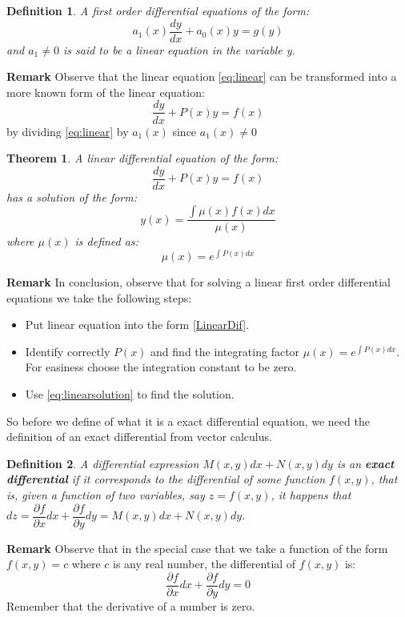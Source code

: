 \documentclass[10pt,a4paper]{article}
\newtheorem{define}{Definition}
\newtheorem{thm}{Theorem}
\begin{document}
\begin{define}
A first order differential equations of the form:
\begin{equation} \label{eq:linear}
a_1(x)\dfrac{dy}{dx} + a_0(x)y = g(y)
\end{equation}
and $a_1 \neq 0$ is said to be a linear equation in the variable y.
\end{define}
\textbf{Remark} Observe that the linear equation \eqref{eq:linear}
can be transformed into a more known form of the linear equation:
\begin{equation} \label{LinearDif}
\dfrac{dy}{dx} + P(x)y 	= f(x)
\end{equation}
by dividing \eqref{eq:linear} by $a_1(x)$ since $a_1(x) \neq 0$
\begin{thm}
A linear differential equation of the form:
\begin{equation*}
\dfrac{dy}{dx} + P(x)y 	= f(x)
\end{equation*}
has a solution of the form:
\begin{equation} \label{eq:linearsolution}
y(x) = \dfrac{\int \mu(x)f(x)dx}{ \mu(x)}
\end{equation}
where $\mu(x)$ is defined as:
\begin{equation*}
\mu(x) = e^{ \int P(x) dx}
\end{equation*}
\end{thm}
\textbf{Remark} In conclusion, observe that for solving a linear first order differential equations we take the following steps:
\begin{itemize}
\item Put linear equation into the form \eqref{LinearDif}.
\item Identify correctly $P(x)$ and find the integrating factor $ \mu(x) = e^{ \int P(x) dx}$. For easiness choose the integration constant to be zero.
\item Use \eqref{eq:linearsolution} to find the solution.
\end{itemize} 
So before we define of what it is a exact differential equation, we need the definition of an exact differential from vector calculus.
\begin{define}
A differential expression $ M(x,y)dx + N(x,y)dy $ is an \textbf{exact differential} if it corresponds to the differential of some function $f(x,y)$, that is, given a function of two variables, say $ z = f(x,y) $, it happens that $ dz =  \dfrac{\partial f}{\partial x}dx + \dfrac{\partial f}{\partial y}dy = M(x,y)dx + N(x,y)dy $.
\end{define}
\textbf{Remark}
Observe that in the special case that we take a function of the form $ f(x,y) = c $ where $c$ is any real number, the differential of $f(x,y)$ is:
\begin{equation*}
\dfrac{\partial f}{\partial x} dx + \dfrac{\partial f}{\partial y} dy = 0
\end{equation*}
Remember that the derivative of a number is zero. 
\end{document}
